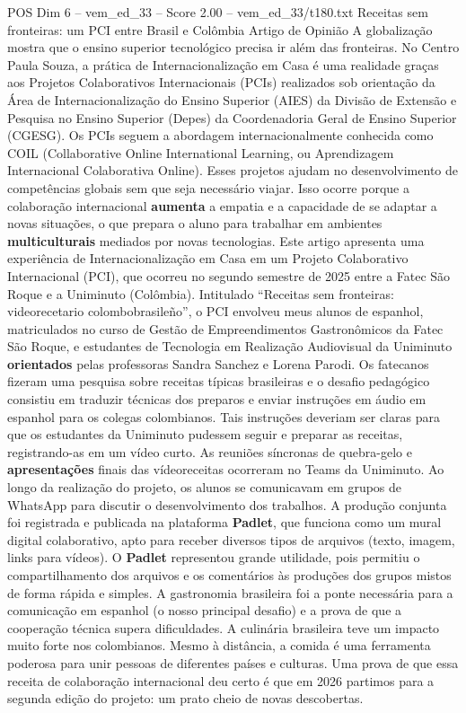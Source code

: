 \begin{textsample}{POS Dim 6 – vem\_ed\_33 – Score 2.00 – vem\_ed\_33/t180.txt}  \label{ex:f6_pos_066}
Receitas sem fronteiras: um PCI entre Brasil e Colômbia Artigo de Opinião A globalização mostra que o ensino superior tecnológico precisa ir além das fronteiras.
No Centro Paula Souza, a prática de Internacionalização em Casa é uma realidade graças aos Projetos Colaborativos Internacionais (PCIs) realizados sob orientação da Área de Internacionalização do Ensino Superior (AIES) da Divisão de Extensão e Pesquisa no Ensino Superior (Depes) da Coordenadoria Geral de Ensino Superior (CGESG).
Os PCIs seguem a abordagem internacionalmente conhecida como COIL (Collaborative Online International Learning, ou Aprendizagem Internacional Colaborativa Online).
Esses projetos ajudam no desenvolvimento de competências globais sem que seja necessário viajar.
Isso ocorre porque a colaboração internacional \textbf{aumenta} a empatia e a capacidade de se adaptar a novas situações, o que prepara o aluno para trabalhar em ambientes \textbf{multiculturais} mediados por novas tecnologias.
Este artigo apresenta uma experiência de Internacionalização em Casa em um Projeto Colaborativo Internacional (PCI), que ocorreu no segundo semestre de 2025 entre a Fatec São Roque e a Uniminuto (Colômbia).
Intitulado “Receitas sem fronteiras: videorecetario colombobrasileño”, o PCI envolveu meus alunos de espanhol, matriculados no curso de Gestão de Empreendimentos Gastronômicos da Fatec São Roque, e estudantes de Tecnologia em Realização Audiovisual da Uniminuto \textbf{orientados} pelas professoras Sandra Sanchez e Lorena Parodi.
Os fatecanos fizeram uma pesquisa sobre receitas típicas brasileiras e o desafio pedagógico consistiu em traduzir técnicas dos preparos e enviar instruções em áudio em espanhol para os colegas colombianos.
Tais instruções deveriam ser claras para que os estudantes da Uniminuto pudessem seguir e preparar as receitas, registrando-as em um vídeo curto.
As reuniões síncronas de quebra-gelo e \textbf{apresentações} finais das vídeoreceitas ocorreram no Teams da Uniminuto.
Ao longo da realização do projeto, os alunos se comunicavam em grupos de WhatsApp para discutir o desenvolvimento dos trabalhos.
A produção conjunta foi registrada e publicada na plataforma \textbf{Padlet}, que funciona como um mural digital colaborativo, apto para receber diversos tipos de arquivos (texto, imagem, links para vídeos).
O \textbf{Padlet} representou grande utilidade, pois permitiu o compartilhamento dos arquivos e os comentários às produções dos grupos mistos de forma rápida e simples.
A gastronomia brasileira foi a ponte necessária para a comunicação em espanhol (o nosso principal desafio) e a prova de que a cooperação técnica supera dificuldades.
A culinária brasileira teve um impacto muito forte nos colombianos.
Mesmo à distância, a comida é uma ferramenta poderosa para unir pessoas de diferentes países e culturas.
Uma prova de que essa receita de colaboração internacional deu certo é que em 2026 partimos para a segunda edição do projeto: um prato cheio de novas descobertas.

\end{textsample}
